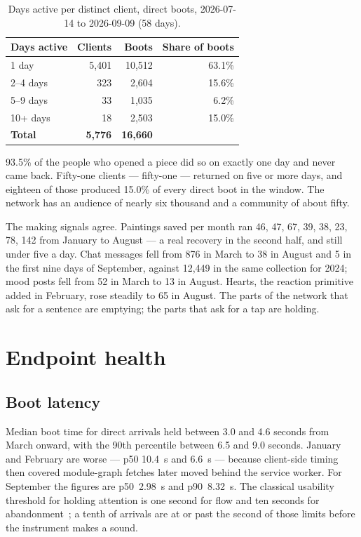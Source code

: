 \documentclass[10pt,letterpaper,twocolumn]{article}
\begin{document}
\begin{table}[t]
\centering
\footnotesize
\caption{Days active per distinct client, direct boots, 2026-07-14 to 2026-09-09 (58 days).}
\label{tab:ret}
\vspace{0.35em}
\begin{tabularx}{\columnwidth}{@{}X r r r@{}}
\toprule
\textbf{Days active} & \textbf{Clients} & \textbf{Boots} & \textbf{Share of boots} \\
\midrule
1 day       & 5,401 & 10,512 & 63.1\% \\
2--4 days   &   323 &  2,604 & 15.6\% \\
5--9 days   &    33 &  1,035 &  6.2\% \\
10+ days    &    18 &  2,503 & 15.0\% \\
\midrule
\textbf{Total} & \textbf{5,776} & \textbf{16,660} & \\
\bottomrule
\end{tabularx}
\end{table}

93.5\% of the people who opened a piece did so on exactly one day and
never came back. Fifty-one clients --- fifty-one --- returned on five or
more days, and eighteen of those produced 15.0\% of every direct boot
in the window. The network has an audience of nearly six thousand and a
community of about fifty.

The making signals agree. Paintings saved per month ran 46, 47, 67,
39, 38, 23, 78, 142 from January to August --- a real recovery in the
second half, and still under five a day. Chat messages fell from 876 in
March to 38 in August and 5 in the first nine days of September, against
12,449 in the same collection for 2024; mood posts fell from 52 in
March to 13 in August. Hearts, the reaction primitive added in
February, rose steadily to 65 in August. The parts of the network that
ask for a sentence are emptying; the parts that ask for a tap are
holding.

\section{Endpoint health}
\label{sec:health}

\subsection{Boot latency}

Median boot time for direct arrivals held between 3.0 and 4.6 seconds
from March onward, with the 90th percentile between 6.5 and 9.0
seconds. January and February are worse --- p50 10.4~s and 6.6~s ---
because client-side timing then covered module-graph fetches later
moved behind the service worker. For September the figures are
p50~2.98~s and p90~8.32~s. The classical usability threshold
for holding attention is one second for flow and ten seconds for
abandonment~\citep{nielsen1993response}; a tenth of arrivals are at or
past the second of those limits before the instrument makes a sound.
\end{document}
